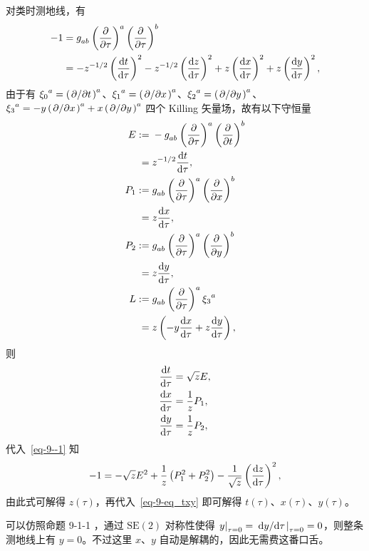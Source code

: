 \begin{xiti}
	\begin{jie}
		对类时测地线，有
		\begin{equation}
			\begin{split}
				-1 &= \tensor{g}{_a_b} \tensor{\left( \pdv{\tau} \right)}{^a} \tensor{\left( \pdv{\tau} \right)}{^b}\\
				&= - z^{-1/2} \left( \dv{t}{\tau} \right)^2 - z^{-1/2} \left( \dv{z}{\tau} \right)^2 + z \left( \dv{x}{\tau} \right)^2 + z \left( \dv{y}{\tau} \right)^2,\label{eq-9--1}
			\end{split}
		\end{equation}
		由于有 $\tensor{{\xi_0}}{^a} = \tensor{\left( \pdv*{t} \right)}{^a}$、$\tensor{{\xi_1}}{^a} = \tensor{\left( \pdv*{x} \right)}{^a}$、$\tensor{{\xi_2}}{^a} = \tensor{\left( \pdv*{y} \right)}{^a}$、$\tensor{{\xi_3}}{^a} = - y \tensor{\left( \pdv*{x} \right)}{^a} + x \tensor{\left( \pdv*{y} \right)}{^a}$ 四个 Killing 矢量场，故有以下守恒量
		\begin{align*}
			E :={}& - \tensor{g}{_a_b} \tensor{\left( \pdv{\tau} \right)}{^a} \tensor{\left( \pdv{t} \right)}{^b}\\
			={} & z^{-1/2} \dv{t}{\tau},\\
			P_1 :={} & \tensor{g}{_a_b} \tensor{\left( \pdv{\tau} \right)}{^a} \tensor{\left( \pdv{x} \right)}{^b}\\
			={} & z \dv{x}{\tau},\\
			P_2 :={} & \tensor{g}{_a_b} \tensor{\left( \pdv{\tau} \right)}{^a} \tensor{\left( \pdv{y} \right)}{^b}\\
			={} & z \dv{y}{\tau},\\
			L := {} & \tensor{g}{_a_b} \tensor{\left( \pdv{\tau} \right)}{^a} \tensor{{\xi_3}}{^a}\\
			={}& z \left( -y \dv{x}{\tau} + z \dv{y}{\tau} \right),
		\end{align*}
		则
		\begin{equation}
			\begin{split}
				\dv{t}{\tau} &= \sqrt{z} E,\\
				\dv{x}{\tau} &= \frac{1}{z} P_1,\\
				\dv{y}{\tau} &= \frac{1}{z} P_2,
			\end{split}\label{eq-9-eq_txy}
		\end{equation}
		代入~\eqref{eq-9--1} 知
		\begin{equation*}
			-1 = - \sqrt{z} E^2 + \frac{1}{z} \left( P_1^2 + P_2^2 \right) - \frac{1}{\sqrt{z}} \left( \dv{z}{\tau} \right)^2,
		\end{equation*}
		由此式可解得 $z(\tau)$，再代入~\eqref{eq-9-eq_txy} 即可解得 $t(\tau)$、$x(\tau)$、$y(\tau)$。
		\begin{tcolorbox}[breakable,title=补充,fonttitle=\normalfont\bfseries]
			可以仿照命题 9-1-1 ，通过 $\mathrm{SE}(2)$ 对称性使得 $\left. y \right|_{\tau=0} = \left. \dv*{y}{\tau} \right|_{\tau=0} = 0$，则整条测地线上有 $y=0$。不过这里 $x$、$y$ 自动是解耦的，因此无需费这番口舌。
		\end{tcolorbox}
	\end{jie}


\end{xiti}

